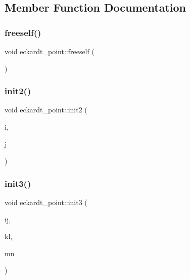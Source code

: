 \subsection{Member Function Documentation}
\mbox{\label{classeckardt__point_acd5976cca5869b51c9226dc9ff2376a7}} 
\subsubsection{\texorpdfstring{freeself()}{freeself()}}
{\footnotesize\ttfamily void eckardt\+\_\+point\+::freeself (\begin{DoxyParamCaption}{ }\end{DoxyParamCaption})}

\mbox{\label{classeckardt__point_a3ebf69b5c9ce60d4c8371ebe384bfb81}} 
\subsubsection{\texorpdfstring{init2()}{init2()}}
{\footnotesize\ttfamily void eckardt\+\_\+point\+::init2 (\begin{DoxyParamCaption}\item[{\mbox{\hyperlink{galois_8h_a09fddde158a3a20bd2dcadb609de11dc}{I\+NT}}}]{i,  }\item[{\mbox{\hyperlink{galois_8h_a09fddde158a3a20bd2dcadb609de11dc}{I\+NT}}}]{j }\end{DoxyParamCaption})}

\mbox{\label{classeckardt__point_a44c0c0594e27651063031c618cc63343}} 
\subsubsection{\texorpdfstring{init3()}{init3()}}
{\footnotesize\ttfamily void eckardt\+\_\+point\+::init3 (\begin{DoxyParamCaption}\item[{\mbox{\hyperlink{galois_8h_a09fddde158a3a20bd2dcadb609de11dc}{I\+NT}}}]{ij,  }\item[{\mbox{\hyperlink{galois_8h_a09fddde158a3a20bd2dcadb609de11dc}{I\+NT}}}]{kl,  }\item[{\mbox{\hyperlink{galois_8h_a09fddde158a3a20bd2dcadb609de11dc}{I\+NT}}}]{mn }\end{DoxyParamCaption})}

